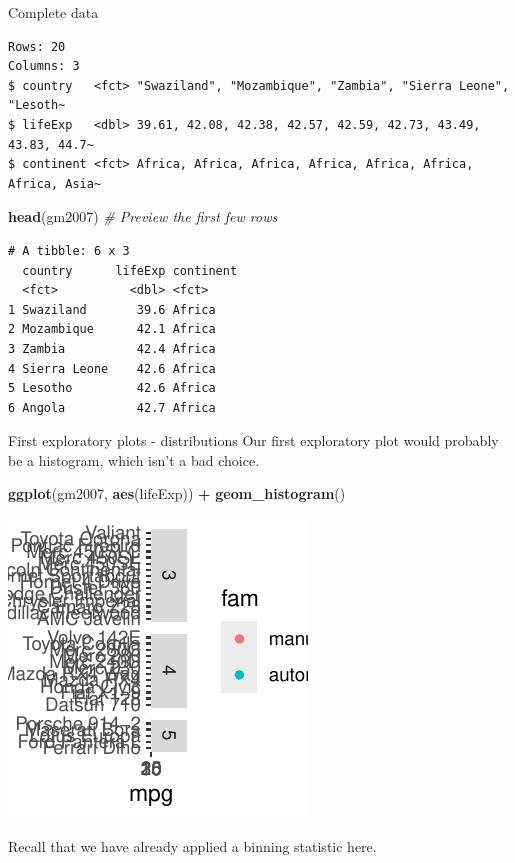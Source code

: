\documentclass[
  ignorenonframetext,
]{beamer}
\newenvironment{Shaded}{\begin{snugshade}}{\end{snugshade}}
\newcommand{\CommentTok}[1]{\textcolor[rgb]{0.56,0.35,0.01}{\textit{#1}}}
\newcommand{\FunctionTok}[1]{\textcolor[rgb]{0.13,0.29,0.53}{\textbf{#1}}}
\newcommand{\NormalTok}[1]{#1}
\newcommand{\SpecialCharTok}[1]{\textcolor[rgb]{0.81,0.36,0.00}{\textbf{#1}}}
\begin{document}
\begin{frame}[fragile]{Complete data}
\begin{verbatim}
Rows: 20
Columns: 3
$ country   <fct> "Swaziland", "Mozambique", "Zambia", "Sierra Leone", "Lesoth~
$ lifeExp   <dbl> 39.61, 42.08, 42.38, 42.57, 42.59, 42.73, 43.49, 43.83, 44.7~
$ continent <fct> Africa, Africa, Africa, Africa, Africa, Africa, Africa, Asia~
\end{verbatim}

\begin{Shaded}
\begin{Highlighting}[]
\FunctionTok{head}\NormalTok{(gm2007)     }\CommentTok{\# Preview the first few rows}
\end{Highlighting}
\end{Shaded}

\begin{verbatim}
# A tibble: 6 x 3
  country      lifeExp continent
  <fct>          <dbl> <fct>    
1 Swaziland       39.6 Africa   
2 Mozambique      42.1 Africa   
3 Zambia          42.4 Africa   
4 Sierra Leone    42.6 Africa   
5 Lesotho         42.6 Africa   
6 Angola          42.7 Africa   
\end{verbatim}
\end{frame}

\begin{frame}[fragile]{First exploratory plots - distributions}
\label{first-exploratory-plots---distributions}
Our first exploratory plot would probably be a histogram, which isn't a
bad choice.


\begin{Shaded}
\begin{Highlighting}[]
\FunctionTok{ggplot}\NormalTok{(gm2007, }\FunctionTok{aes}\NormalTok{(lifeExp)) }\SpecialCharTok{+} \FunctionTok{geom\_histogram}\NormalTok{()}
\end{Highlighting}
\end{Shaded}

\begin{center}\includegraphics[width=0.5\linewidth]{Figs/unnamed-chunk-92-1} \end{center}

Recall that we have already applied a binning statistic here.
\end{frame}
\end{document}
